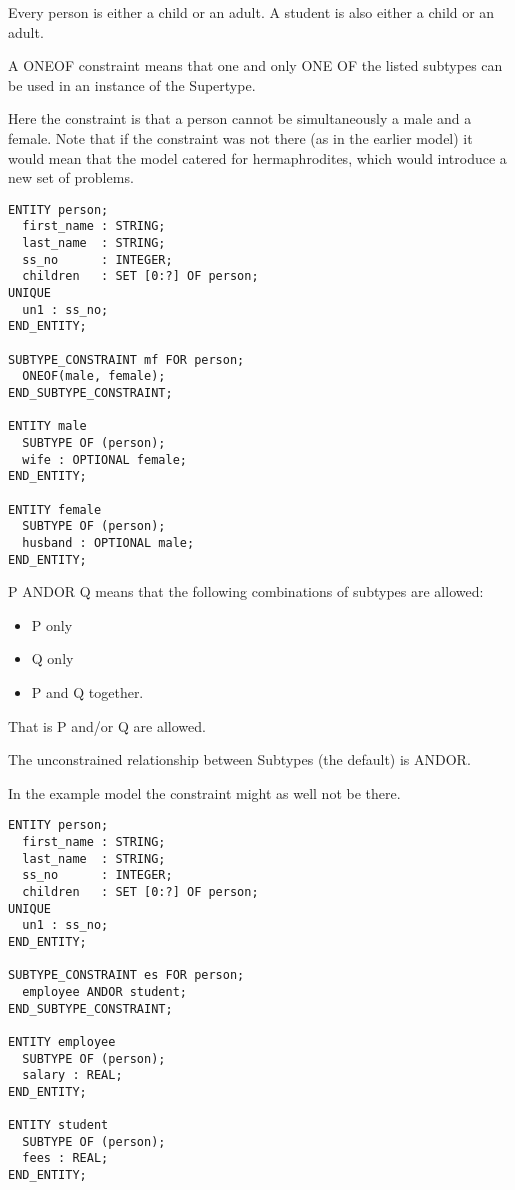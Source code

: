 Every person is either a child or an adult. A student
is also either a child or an adult.



\begin{remarks}
\remintro


A ONEOF constraint means that one and only ONE OF the listed subtypes
can be used in an instance of the Supertype.

    Here the constraint is that a person cannot be simultaneously 
a male and a female. Note that if the constraint was not there (as 
in the earlier model) it
would mean that the model catered for hermaphrodites, which would introduce
a new set of problems.

\remend
\end{remarks}


\begin{verbatim}
ENTITY person;
  first_name : STRING;
  last_name  : STRING;
  ss_no      : INTEGER;
  children   : SET [0:?] OF person;
UNIQUE
  un1 : ss_no;
END_ENTITY;

SUBTYPE_CONSTRAINT mf FOR person;
  ONEOF(male, female);
END_SUBTYPE_CONSTRAINT;

ENTITY male
  SUBTYPE OF (person);
  wife : OPTIONAL female;
END_ENTITY;

ENTITY female
  SUBTYPE OF (person);
  husband : OPTIONAL male;
END_ENTITY;
\end{verbatim}

\begin{remarks}
\remintro


P ANDOR Q means that the following combinations of subtypes are allowed:
\begin{itemize}
\item P only
\item Q only
\item P and Q together.
\end{itemize}
That is P and/or Q are allowed.

The unconstrained relationship between Subtypes (the default) is ANDOR.

In the example model the constraint might as well not be there.

\remend
\end{remarks}


\begin{verbatim}
ENTITY person;
  first_name : STRING;
  last_name  : STRING;
  ss_no      : INTEGER;
  children   : SET [0:?] OF person;
UNIQUE
  un1 : ss_no;
END_ENTITY;

SUBTYPE_CONSTRAINT es FOR person;
  employee ANDOR student;
END_SUBTYPE_CONSTRAINT;

ENTITY employee
  SUBTYPE OF (person);
  salary : REAL;
END_ENTITY;

ENTITY student
  SUBTYPE OF (person);
  fees : REAL;
END_ENTITY;
\end{verbatim}

